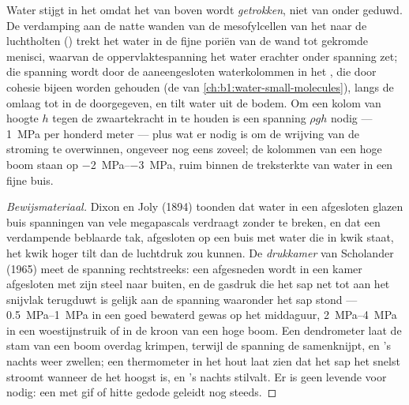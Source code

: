 \begin{theorem}\label{thm:b1:plant-transport:cohesiontension}
Water stijgt in het  omdat het van boven wordt \emph{getrokken}, niet
van onder geduwd. De verdamping aan de natte wanden van de mesofylcellen
van het  naar de luchtholten (\emph{}) trekt het water in
de fijne poriën van de wand tot gekromde menisci, waarvan de
oppervlaktespanning het water erachter onder spanning zet; die spanning
wordt door de aaneengesloten waterkolommen in het , die door cohesie
bijeen worden gehouden (de  van
\cref{ch:b1:water-small-molecules}), langs de  omlaag tot in de
 doorgegeven, en tilt water uit de bodem. Om een kolom van hoogte
$h$ tegen de zwaartekracht in te houden is een spanning $\rho g h$ nodig
--- \qty{1}{MPa} per honderd meter --- plus wat er nodig is om de wrijving
van de stroming te overwinnen, ongeveer nog eens zoveel; de kolommen van
een hoge boom staan op \qtyrange{-2}{-3}{MPa}, ruim binnen de treksterkte
van water in een fijne buis.
\end{theorem}
\begin{proof}[Bewijsmateriaal]
Dixon en Joly (1894) toonden dat water in een afgesloten glazen buis
spanningen van vele megapascals verdraagt zonder te breken, en dat een
verdampende beblaarde tak, afgesloten op een buis met water die in kwik
staat, het kwik hoger tilt dan de luchtdruk zou kunnen. De \emph{drukkamer}
van Scholander (1965) meet de spanning rechtstreeks: een afgesneden 
wordt in een kamer afgesloten met zijn steel naar buiten, en de gasdruk die
het sap net tot aan het snijvlak terugduwt is gelijk aan de spanning
waaronder het sap stond --- \qtyrange{0.5}{1}{MPa} in een goed bewaterd
gewas op het middaguur, \qtyrange{2}{4}{MPa} in een woestijnstruik of in de
kroon van een hoge boom. Een dendrometer laat de stam van een boom overdag
krimpen, terwijl de spanning de  samenknijpt, en 's nachts weer
zwellen; een thermometer in het hout laat zien dat het sap het snelst
stroomt wanneer de  het hoogst is, en 's nachts stilvalt. Er is
geen levende  voor nodig: een met gif of hitte gedode  geleidt
nog steeds.
\end{proof}

